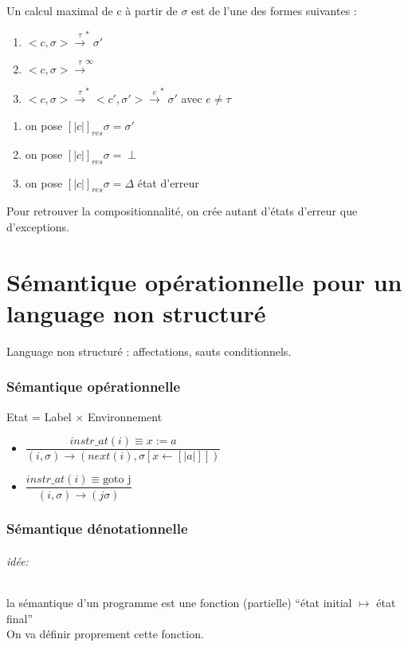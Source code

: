 \documentclass[10pt,a4paper]{article}
\newcommand{\semm}[1]{\left[| #1 | \right]}
\begin{document}
\begin{thm}{} Un calcul maximal de c à partir de $\sigma$ est de l'une des formes suivantes : 
\begin{enumerate}
\item $<c, \sigma> \xrightarrow{\tau}^* \sigma'$
\item $<c, \sigma> \xrightarrow{\tau}^{\infty}$
\item $<c, \sigma> \xrightarrow{\tau}^* <c',\sigma'> \xrightarrow{e}^* \sigma'$ avec $e \not = \tau$
\end{enumerate}
\begin{enumerate}
\item on pose $\semm{c}_{res} \sigma = \sigma'$
\item on pose $\semm{c}_{res} \sigma = \perp$
\item on pose $\semm{c}_{res} \sigma = \Delta$ état d'erreur
\end{enumerate}
\end{thm}
Pour retrouver la compositionnalité, on crée autant d'états d'erreur que d'exceptions.

\part{Sémantique opérationnelle pour un language non structuré}
Language non structuré : affectations, sauts conditionnels.

\section{Sémantique opérationnelle}
Etat = Label $\times$ Environnement\\

\begin{itemize}
\item $\dfrac{instr\_at(i) \equiv x:=a }{(i, \sigma) \rightarrow (next(i), \sigma[x \leftarrow \semm{a}])}$
\item $\dfrac{instr\_at(i) \equiv \text{goto j} }{(i, \sigma) \rightarrow (j \sigma)}$
\end{itemize}

\section{Sémantique dénotationnelle}
\paragraph{idée:} la sémantique d'un programme est une fonction (partielle) ``état initial $\mapsto$ état final''\\
On va définir proprement cette fonction.
\end{document}

